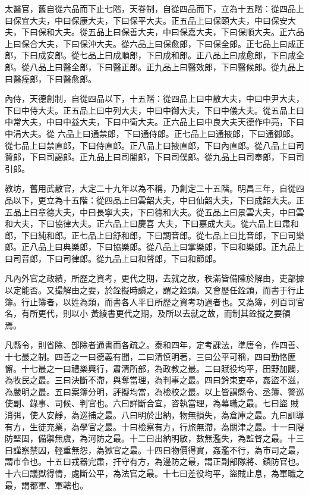 \begin{pinyinscope}
 太醫官，舊自從六品而下止七階，天眷制，自從四品而下，立為十五階：從四品上曰保宜大夫，中曰保康大夫，下曰保平大夫。正五品上曰保頤大夫，中曰保安大夫，下曰保和大夫。從五品上曰保善大夫，中曰保嘉大夫，下曰保順大夫。正六品
 上曰保合大夫，下曰保沖大夫。從六品上曰保愈郎，下曰保全郎。正七品上曰成正郎，下曰成安郎。從七品上曰成順郎，下曰成和郎。正八品上曰成愈郎，下曰成全郎。從八品上曰醫全郎，下曰醫正郎。正九品上曰醫效郎，下曰醫候郎。從九品上曰醫痊郎，下曰醫愈郎。



 內侍，天德創制，自從四品以下，十五階：從四品上曰中散大夫，中曰中尹大夫，下曰中侍大夫。正五品上曰中列大夫，中曰中御大夫，下曰中儀大夫。從五品上曰中常大夫，中曰中益大夫，下曰中衛大夫。正六品上曰中良大夫天德作中亮，下曰中涓大夫。從
 六品上曰通禁郎，下曰通侍郎。正七品上曰通掖郎，下曰通御郎。從七品上曰禁直郎，下曰侍直郎。正八品上曰掖直郎，下曰內直郎。從八品上曰司贊郎，下曰司謁郎。正九品上曰司閽郎，下曰司僕郎。從九品上曰司奉郎，下曰司引郎。



 教坊，舊用武散官，大定二十九年以為不稱，乃創定二十五階。明昌三年，自從四品以下，更立為十五階：從四品上曰雲韶大夫，中曰仙韶大夫，下曰成韶大夫。正五品上曰章德大夫，中曰長寧大夫，下曰德和大夫。從五品上曰景雲大夫，中曰雲和大夫，下曰協律大夫。正六品上曰慶喜
 大夫，下曰嘉成大夫。從六品上曰肅和郎，下曰純和郎。正七品上曰舒和郎，下曰調音郎。從七品上曰比音郎，下曰司樂郎。正八品上曰典樂郎，下曰協樂郎。從八品上曰掌樂郎，下曰和樂郎。正九品上曰司音郎，下曰司律郎。從九品上曰和聲郎，下曰和節郎。



 凡內外官之政績，所歷之資考，更代之期，去就之故，秩滿皆備陳於解由，吏部據以定能否。又撮解由之要，於銓擬時讀之，謂之銓頭。又會歷任銓頭，而書于行止簿。行止簿者，以姓為類，而書各人平日所歷之資考功過者也。又為簿，列百司官名，有所更代，則以小
 黃綾書更代之期，及所以去就之故，而制其銓擬之要領焉。



 凡縣令，則省除、部除者通書而各疏之。泰和四年，定考課法，準唐令，作四善、十七最之制。四善之一曰德義有聞，二曰清慎明著，三曰公平可稱，四曰勤恪匪懈。十七最之一曰禮樂興行，肅清所部，為政教之最。二曰賦役均平，田野加闢，為牧民之最。三曰決斷不滯，與奪當理，為判事之最。四曰鈐束吏卒，姦盜不滋，為嚴明之最。五曰案簿分明，評擬均當，為檢校之最。以上皆謂縣令、丞簿、警巡使副、錄事、司候、判官也。六曰詳斷合宜，咨執當理，為幕職之最。七曰盜
 賊消弭，使人安靜，為巡捕之最。八曰明於出納，物無損失，為倉庫之最。九曰訓導有方，生徒充業，為學官之最。十曰檢察有方，行旅無滯，為關津之最。十一曰隄防堅固，備禦無虞，為河防之最。十二曰出納明敏，數無濫失，為監督之最。十三曰謹察禁囚，輕重無怨，為獄官之最。十四曰物價得實，姦濫不行，為市司之最，謂市令也。十五曰戎器完肅，扞守有方，為邊防之最，謂正副部隊將、鎮防官也。十六曰議獄得情，處斷公平，為法官之最。十七曰差役均平，盜賊止息，為軍職之最，謂都軍、軍轄也。




\end{pinyinscope}
